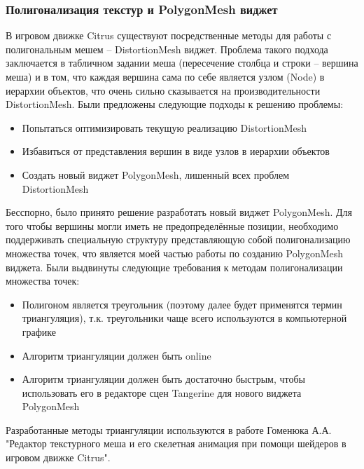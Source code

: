\documentclass{fefu}
\begin{document}
\subsubsection{Полигонализация текстур и PolygonMesh виджет}
В игровом движке Citrus существуют посредственные методы для работы с полигональным мешем --
DistortionMesh виджет. Проблема такого подхода заключается в табличном задании меша (пересечение столбца и строки --
вершина меша) и в том, что каждая вершина сама по себе является узлом (Node) в иерархии объектов, что очень сильно сказывается на
производительности DistortionMesh. Были предложены следующие подходы к решению проблемы:
\begin{itemize}
    \item Попытаться оптимизировать текущую реализацию DistortionMesh
    \item Избавиться от представления вершин в виде узлов в иерархии объектов
    \item Создать новый виджет PolygonMesh, лишенный всех проблем DistortionMesh
\end{itemize}
Бесспорно, было принято решение разработать новый виджет PolygonMesh. Для того чтобы вершины могли
иметь не предопределённые позиции, необходимо поддерживать специальную структуру представляющую собой
полигонализацию множества точек, что является моей частью работы по созданию PolygonMesh виджета. Были выдвинуты
следующие требования к методам полигонализации множества точек:
\begin{itemize}
    \item Полигоном является треугольник (поэтому далее будет применятся термин триангуляция), т.к.
треугольники чаще всего используются в компьютерной графике
    \item Алгоритм триангуляции должен быть online
    \item Алгоритм триангуляции должен быть достаточно быстрым, чтобы использовать его в редакторе сцен
    Tangerine для нового виджета PolygonMesh
\end{itemize}
Разработанные методы триангуляции используются в работе Гоменюка А.А. "Редактор текстурного меша и его скелетная анимация
при помощи шейдеров в игровом движке Citrus".
\end{document}
